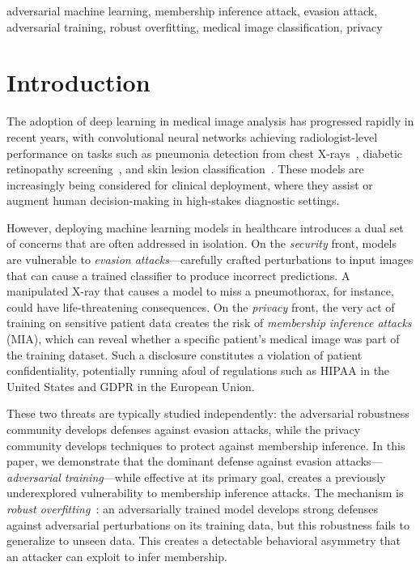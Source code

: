 \documentclass[conference]{IEEEtran}
\begin{document}
\begin{IEEEkeywords}
adversarial machine learning, membership inference attack, evasion attack, adversarial training, robust overfitting, medical image classification, privacy
\end{IEEEkeywords}


\section{Introduction}

The adoption of deep learning in medical image analysis has progressed rapidly in recent years, with convolutional neural networks achieving radiologist-level performance on tasks such as pneumonia detection from chest X-rays~\cite{rajpurkar2017chexnet}, diabetic retinopathy screening~\cite{gulshan2016development}, and skin lesion classification~\cite{esteva2017dermatologist}. These models are increasingly being considered for clinical deployment, where they assist or augment human decision-making in high-stakes diagnostic settings.

However, deploying machine learning models in healthcare introduces a dual set of concerns that are often addressed in isolation. On the \textit{security} front, models are vulnerable to \textit{evasion attacks}---carefully crafted perturbations to input images that can cause a trained classifier to produce incorrect predictions. A manipulated X-ray that causes a model to miss a pneumothorax, for instance, could have life-threatening consequences. On the \textit{privacy} front, the very act of training on sensitive patient data creates the risk of \textit{membership inference attacks} (MIA), which can reveal whether a specific patient's medical image was part of the training dataset. Such a disclosure constitutes a violation of patient confidentiality, potentially running afoul of regulations such as HIPAA in the United States and GDPR in the European Union.

These two threats are typically studied independently: the adversarial robustness community develops defenses against evasion attacks, while the privacy community develops techniques to protect against membership inference. In this paper, we demonstrate that the dominant defense against evasion attacks---\textit{adversarial training}---while effective at its primary goal, creates a previously underexplored vulnerability to membership inference attacks. The mechanism is \textit{robust overfitting}~\cite{rice2020overfitting}: an adversarially trained model develops strong defenses against adversarial perturbations on its training data, but this robustness fails to generalize to unseen data. This creates a detectable behavioral asymmetry that an attacker can exploit to infer membership.
\end{document}
